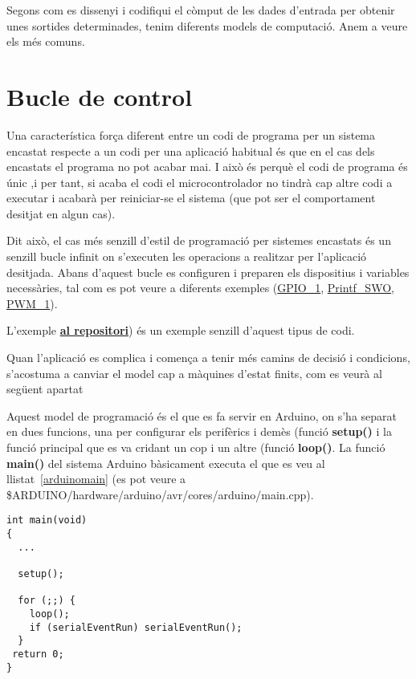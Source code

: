 Segons com es dissenyi i codifiqui el còmput de les dades d'entrada per obtenir unes sortides determinades, tenim diferents models de computació. Anem a veure els més comuns.

\section{Bucle de control}
\label{sec:buclecontrol}

Una característica força diferent entre un codi de programa per un sistema encastat respecte a un codi per una aplicació habitual és que en el cas dels encastats el programa no pot acabar mai. I això és perquè el codi de programa és únic ,i per tant, si acaba el codi el microcontrolador no tindrà cap altre codi a executar i acabarà per reiniciar-se el sistema (que pot ser el comportament desitjat en algun cas).

Dit això, el cas més senzill d'estil de programació per sistemes encastats és un senzill bucle infinit on s'executen les operacions a realitzar per l'aplicació desitjada. Abans d'aquest bucle es configuren i preparen els dispositius i variables necessàries, tal com es pot veure a diferents exemples (\href{https://github.com/mariusmm/cursembedded/blob/master/Simplicity/GPIO_1/}{GPIO\_1}, \href{https://github.com/mariusmm/cursembedded/tree/master/Simplicity/Printf_SWO}{Printf\_SWO}, \href{https://github.com/mariusmm/cursembedded/blob/master/Simplicity/PWM_1/}{PWM\_1}). 

L'exemple  \href{https://github.com/mariusmm/cursembedded/tree/master/Simplicity/GPIO_1}{\bf al repositori}) és un exemple senzill d'aquest tipus de codi.

Quan l'aplicació es complica i comença a tenir més camins de decisió i condicions, s'acostuma a canviar el model cap a màquines d'estat finits, com es veurà al següent apartat

Aquest model de programació és el que es fa servir en Arduino, on s'ha separat en dues funcions, una per configurar els perifèrics i demès (funció {\bf setup()} i la funció principal que es va cridant un cop i un altre (funció {\bf loop()}. La funció {\bf main()} del sistema Arduino bàsicament executa el que es veu al llistat~\ref{arduinomain} (es pot veure a \$ARDUINO/hardware/arduino/avr/cores/arduino/main.cpp).

\begin{lstlisting}[style=customc, label=arduinomain, caption=funció main() d'Arduino]
 int main(void)
{
  ...

  setup();

  for (;;) {
    loop();
    if (serialEventRun) serialEventRun();
  }
 return 0;
} 
\end{lstlisting}


